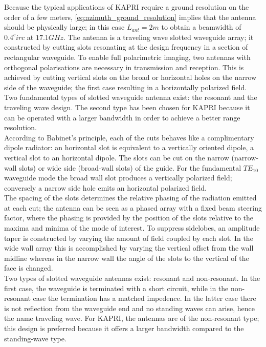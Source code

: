 Because the typical applications of KAPRI require a ground resolution on the order of a few meters, \autoref{eq:azimuth_ground_resolution} implies that the antenna should be physically large; in this case $L_{ant} = 2m$ to obtain a beamwidth of $0.4^circ$ at $17.1 GHz$. The antenna is a traveling wave slotted waveguide array\cite{Hines1953a,Granet2007}; it constructed by cutting slots resonating at the design frequency in a section of rectangular waveguide. To enable full polarimetric imaging, two antennas with orthogonal polarisations are necessary in transmission and reception. This is achieved by cutting vertical slots on the broad or horizontal holes on the narrow side of the waveguide; the first case resulting in a horizontally polarized field. Two fundamental types of slotted waveguide antenna exist\cite{Enjiu2013}: the resonant and the traveling wave design. The second type has been chosen for KAPRI because it can be operated with a larger bandwidth in order to achieve a better range resolution.\\
According to Babinet's principle\cite{kraus88}, each of the cuts behaves like a complimentary dipole radiator: an horizontal slot is equivalent to a vertically oriented dipole, a vertical slot to an horizontal dipole. The slots can be cut on the narrow (narrow-wall slots) or wide side (broad-wall slots) of the guide. For the fundamental $TE_{10}$ waveguide mode the broad wall slot produces a vertically polarized field; conversely a narrow side hole emits an horizontal polarized field\cite{Enjiu2013}.\\
The spacing of the slots determines the relative phasing of the radiation emitted at each cut; the antenna can be seen as a phased array with a fixed beam steering factor, where the phasing is provided by the position of the slots relative to the maxima and minima of the mode of interest. To suppress sidelobes, an amplitude taper is constructed by varying the amount of field coupled by each slot. In the wide wall array this is accomplished by varying the vertical offset from the wall midline whereas in the narrow wall the angle of the slots to the vertical of the face is changed.\\ Two types of slotted waveguide antennas exist: resonant and non-resonant. In the first case, the waveguide is terminated with a short circuit, while in the non-resonant case the termination has a matched impedence. In the latter case there is not reflection from the waveguide end and no standing waves can arise, hence the name traveling wave.
For KAPRI, the antennas are of the non-resonant type; this design is preferred because it offers a larger bandwidth compared to the standing-wave type.\\
